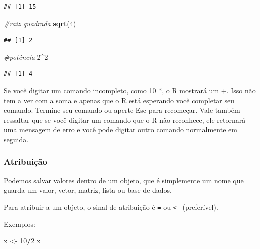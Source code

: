 \documentclass[
]{book}
\newenvironment{Shaded}{\begin{snugshade}}{\end{snugshade}}
\newcommand{\CommentTok}[1]{\textcolor[rgb]{0.56,0.35,0.01}{\textit{#1}}}
\newcommand{\DecValTok}[1]{\textcolor[rgb]{0.00,0.00,0.81}{#1}}
\newcommand{\KeywordTok}[1]{\textcolor[rgb]{0.13,0.29,0.53}{\textbf{#1}}}
\newcommand{\NormalTok}[1]{#1}
\newcommand{\OperatorTok}[1]{\textcolor[rgb]{0.81,0.36,0.00}{\textbf{#1}}}
\newcommand{\StringTok}[1]{\textcolor[rgb]{0.31,0.60,0.02}{#1}}
\begin{document}
\begin{verbatim}
## [1] 15
\end{verbatim}

\begin{Shaded}
\begin{Highlighting}[]
\CommentTok{#raiz quadrada}
\KeywordTok{sqrt}\NormalTok{(}\DecValTok{4}\NormalTok{)}
\end{Highlighting}
\end{Shaded}

\begin{verbatim}
## [1] 2
\end{verbatim}

\begin{Shaded}
\begin{Highlighting}[]
\CommentTok{#potência}
\DecValTok{2}\OperatorTok{^}\DecValTok{2}
\end{Highlighting}
\end{Shaded}

\begin{verbatim}
## [1] 4
\end{verbatim}

Se você digitar um comando incompleto, como 10 *, o R mostrará um +. Isso não tem a ver com a soma e apenas que o R está esperando você completar seu comando. Termine seu comando ou aperte Esc para recomeçar.
Vale também ressaltar que se você digitar um comando que o R não reconhece, ele retornará uma mensagem de erro e você pode digitar outro comando normalmente em seguida.

\hypertarget{atribuiuxe7uxe3o}{%
\subsubsection{Atribuição}\label{atribuiuxe7uxe3o}}

Podemos salvar valores dentro de um objeto, que é simplemente um nome que guarda um valor, vetor, matriz, lista ou base de dados.

Para atribuir a um objeto, o sinal de atribuição é \texttt{=} ou \texttt{\textless{}-} (preferível).

Exemplos:

\begin{Shaded}
\begin{Highlighting}[]
\NormalTok{x <-}\StringTok{ }\DecValTok{10}\OperatorTok{/}\DecValTok{2}
\NormalTok{x}
\end{Highlighting}
\end{Shaded}
\end{document}
